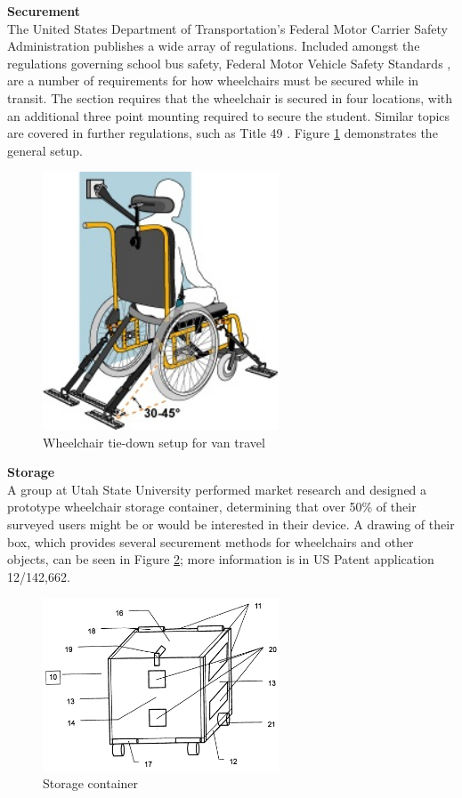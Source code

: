 \noindent\textbf{Securement}\\
The United States Department of Transportation's Federal Motor Carrier Safety Administration publishes a wide array of regulations. Included amongst the regulations governing school bus safety, Federal Motor Vehicle Safety Standards  \cite{fmvs222}, are a number of requirements for how wheelchairs must be secured while in transit. The section requires that the wheelchair is secured in four locations, with an additional three point mounting required to secure the student. Similar topics are covered in further regulations, such as Title 49  \cite{ecfr}. Figure \ref{fig:tie-down} demonstrates the general setup. \\

\begin{figure}[h]
  \centering
     \includegraphics[width=7cm]{images/wc_van.jpg}
   \caption{Wheelchair tie-down setup for van travel}
  \label{fig:tie-down}
\end{figure}

\noindent\textbf{Storage}\\
A group at Utah State University performed market research \cite{USU_survey} and designed a prototype wheelchair storage container, determining that over 50\% of their surveyed users might be or would be interested in their device. A drawing of their box, which provides several securement methods for wheelchairs and other objects, can be seen in Figure \ref{fig:USU_box}; more information is in US Patent application 12/142,662.\cite{USU_patent}

\begin{figure}[h]
  \centering
     \includegraphics[width=7cm]{images/USU_box.png}
   \caption{Storage container}
  \label{fig:USU_box}
\end{figure}


